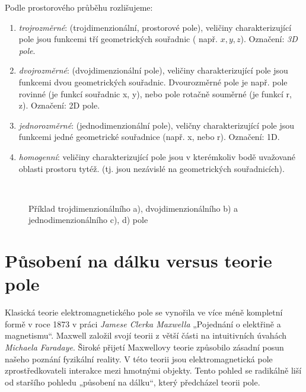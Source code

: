     Podle prostorového průběhu rozlišujeme:
    \begin{enumerate}[noitemsep]
      \item \emph{trojrozměrné}: (trojdimenzionální, prostorové pole), veličiny
            charakterizující pole jsou funkcemi tří geometrických souřadnic ( např. $x, y, z$).
            Označení: \emph{3D pole}.
      \item \emph{dvojrozměrné}: (dvojdimenzionální pole), veličiny charakterizující pole jsou
            funkcemi dvou  geometrických souřadnic. Dvourozměrné pole je např. pole rovinné (je
            funkcí souřadnic x, y), nebo pole rotačně souměrné (je funkcí r, z). Označení: 2D
            pole.
      \item \emph{jednorozměrné}: (jednodimenzionální pole), veličny charakterizující pole jsou
            funkcemi jedné geometrické souřadnice (např. x, nebo r). Označení: 1D.
      \item \emph{homogenní}: veličiny charakterizující pole jsou v kterémkoliv bodě uvažované
            oblasti prostoru tytéž. (tj. jsou nezávislé na geometrických souřadnicích).
    \end{enumerate}      
    \begin{figure}[ht!]
      \centering
        {}          \hspace{1em}            
        {}                      \\
        {}          \hspace{1em}              
        {}                       
      \caption{Příklad trojdimenzionálního a), dvojdimenzionálního b) a jednodimenzionálního c), 
               d) pole}
      \label{fyz:fig0221}
    \end{figure} 
         
  \section{Působení na dálku versus teorie pole}
    Klasická teorie elektromagnetického pole se vynořila ve více méně kompletní formě v roce 1873 v 
    práci \emph{Jamese Clerka Maxwella} „Pojednání o elektřině a magnetismu“. Maxwell založil svojí 
    teorii z větší části na intuitivních úvahách \emph{Michaela Faradaye}. Široké přijetí 
    Maxwellovy teorie způsobilo zásadní posun našeho poznání fyzikální reality. V této teorii jsou 
    elektromagnetická pole zprostředkovateli interakce mezi hmotnými objekty. Tento pohled se 
    radikálně liší od staršího pohledu „působení na dálku“, který předcházel teorii pole.
  
